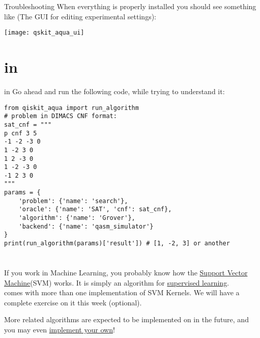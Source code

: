 \documentclass[aspectratio=43]{beamer}
\begin{document}
\begin{frame}{Troubleshooting \qka}
    \small{When everything is properly installed you should see something like (The \qka GUI for editing experimental settings):}
    \begin{center}
        \texttt{[image: qskit\_aqua\_ui]}
    \end{center}
\pagenumber
\end{frame}

\section{\gvsa in \qka}
\begin{frame}[fragile]{\gvsa in \qka}
Go ahead and run the following code, while trying to understand it:\begin{verbatim}
from qiskit_aqua import run_algorithm
# problem in DIMACS CNF format:
sat_cnf = """
p cnf 3 5
-1 -2 -3 0
1 -2 3 0
1 2 -3 0
1 -2 -3 0
-1 2 3 0
"""
params = {
    'problem': {'name': 'search'},
    'oracle': {'name': 'SAT', 'cnf': sat_cnf},
    'algorithm': {'name': 'Grover'},
    'backend': {'name': 'qasm_simulator'}
}
print(run_algorithm(params)['result']) # [1, -2, 3] or another
\end{verbatim}
\end{frame}



\section{\ai}
\begin{frame}{\ai}
\begin{card}
    If you work in Machine Learning, you probably know how the  \href{https://en.wikipedia.org/wiki/Support_vector_machine}{Support Vector Machine}(SVM) works. It is simply an algorithm for \href{https://en.wikipedia.org/wiki/Supervised_learning}{supervised learning}.\\
    \qka comes with more than one implementation of SVM Kernels. We will have a complete exercise on it this week (optional). 
\end{card}
\begin{card}
    More \ai related algorithms are expected to be implemented on \qka in the future, and you may even \href{https://qiskit.org/documentation/aqua/extending.html#algorithms}{implement your own}!
\end{card}
\pagenumber
\end{frame}
\end{document}
